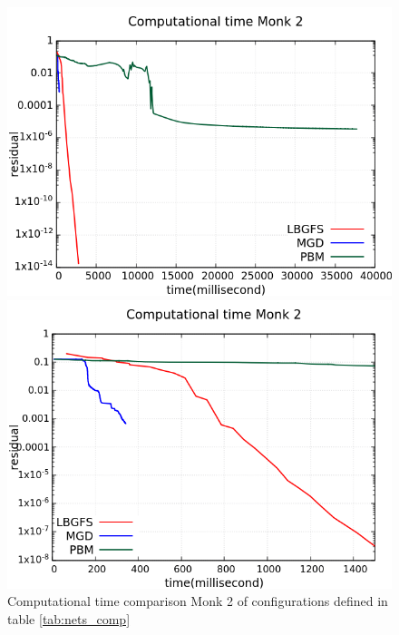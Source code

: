 \begin{figure}[H]
	\centering
	\begin{minipage}[t]{0.5\linewidth}
		\includegraphics[width=\linewidth]{data/Comparison/Monk2/Monk2_CT_Comparison_log_standard.png}
	\end{minipage}%
	\begin{minipage}[t]{0.5\linewidth}
		\includegraphics[width=\linewidth]{data/Comparison/Monk2/Monk2_CT_Comparison_log_zoom.png}
	\end{minipage}
	\caption{Computational time comparison Monk 2 of configurations defined in table \ref{tab:nets_comp}}
	\label{CT-Monk2}
\end{figure}
